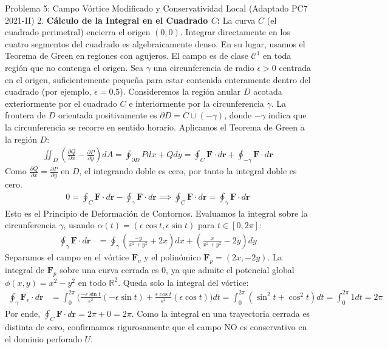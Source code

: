 \documentclass[11pt,a4paper]{article}
\begin{document}
\begin{ejerciciobox}{Problema 5: Campo Vórtice Modificado y Conservatividad Local (Adaptado PC7 2021-II)}
2. \textbf{Cálculo de la Integral en el Cuadrado $C$:}
La curva $C$ (el cuadrado perimetral) encierra el origen $(0,0)$.
Integrar directamente en los cuatro segmentos del cuadrado es algebraicamente denso. En su lugar, usamos el Teorema de Green en regiones con agujeros.
El campo es de clase $\mathcal{C}^1$ en toda región que no contenga el origen.
Sea $\gamma$ una circunferencia de radio $\epsilon > 0$ centrada en el origen, suficientemente pequeña para estar contenida enteramente dentro del cuadrado (por ejemplo, $\epsilon = 0.5$).
Consideremos la región anular $D$ acotada exteriormente por el cuadrado $C$ e interiormente por la circunferencia $\gamma$. La frontera de $D$ orientada positivamente es $\partial D = C \cup (-\gamma)$, donde $-\gamma$ indica que la circunferencia se recorre en sentido horario.
Aplicamos el Teorema de Green a la región $D$:
\begin{align*}
\iint_D \left( \frac{\partial Q}{\partial x} - \frac{\partial P}{\partial y} \right) dA = \oint_{\partial D} P dx + Q dy = \oint_C \mathbf{F} \cdot d\mathbf{r} + \oint_{-\gamma} \mathbf{F} \cdot d\mathbf{r}
\end{align*}
Como $\frac{\partial Q}{\partial x} = \frac{\partial P}{\partial y}$ en $D$, el integrando doble es cero, por tanto la integral doble es cero.
\begin{align*}
0 = \oint_C \mathbf{F} \cdot d\mathbf{r} - \oint_{\gamma} \mathbf{F} \cdot d\mathbf{r} \implies \oint_C \mathbf{F} \cdot d\mathbf{r} = \oint_{\gamma} \mathbf{F} \cdot d\mathbf{r}
\end{align*}
Esto es el Principio de Deformación de Contornos.
Evaluamos la integral sobre la circunferencia $\gamma$, usando $\alpha(t) = (\epsilon\cos t, \epsilon\sin t)$ para $t \in [0, 2\pi]$:
\begin{align*}
\oint_{\gamma} \mathbf{F} \cdot d\mathbf{r} &= \oint_{\gamma} \left( \frac{-y}{x^2+y^2} + 2x \right) dx + \left( \frac{x}{x^2+y^2} - 2y \right) dy
\end{align*}
Separamos el campo en el vórtice $\mathbf{F}_v$ y el polinómico $\mathbf{F}_p = (2x, -2y)$.
La integral de $\mathbf{F}_p$ sobre una curva cerrada es $0$, ya que admite el potencial global $\phi(x,y) = x^2 - y^2$ en todo $\mathbb{R}^2$.
Queda solo la integral del vórtice:
\begin{align*}
\oint_{\gamma} \mathbf{F}_v \cdot d\mathbf{r} &= \int_0^{2\pi} \Big( \frac{-\epsilon\sin t}{\epsilon^2}(-\epsilon\sin t) + \frac{\epsilon\cos t}{\epsilon^2}(\epsilon\cos t) \Big) dt = \int_0^{2\pi} (\sin^2 t + \cos^2 t) dt = \int_0^{2\pi} 1 dt = 2\pi
\end{align*}
Por ende, $\oint_C \mathbf{F} \cdot d\mathbf{r} = 2\pi + 0 = 2\pi$.
Como la integral en una trayectoria cerrada es distinta de cero, confirmamos rigurosamente que el campo NO es conservativo en el dominio perforado $U$.


\end{ejerciciobox}
\end{document}
